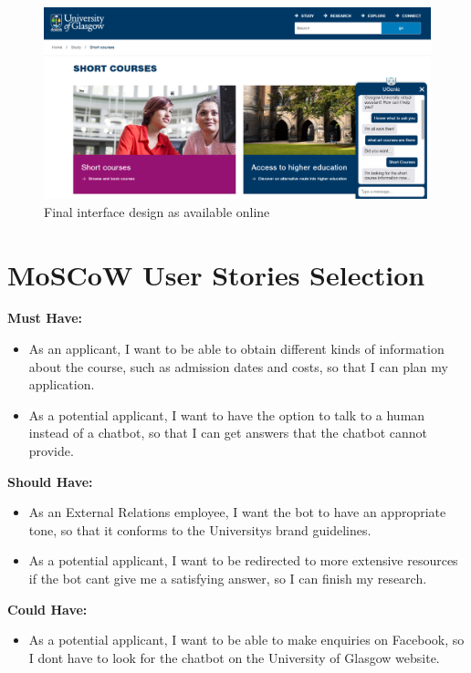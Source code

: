 \documentclass{l3proj}
\begin{document}
\begin{figure}[h!]
    \centering
    \includegraphics[width=0.85\linewidth]{figures/final-image.PNG}
    \caption{Final interface design as available online}
\end{figure}

\section{MoSCoW User Stories Selection}
\label{apdx:moscow}

\textbf{Must Have:}
\begin{itemize}
\item As an applicant, I want to be able to obtain different kinds of information about the course, such as admission dates and costs, so that I can plan my application.
\item As a potential applicant, I want to have the option to talk to a human instead of a chatbot, so that I can get answers that the chatbot cannot provide.
\end{itemize}

\textbf{Should Have:}
\begin{itemize}
\item As an External Relations employee, I want the bot to have an appropriate tone, so that it conforms to the University\textsc{}s brand guidelines.
\item As a potential applicant, I want to be redirected to more extensive resources if the bot can\textsc{}t give me a satisfying answer, so I can finish my research.
\end{itemize}

\textbf{Could Have:}
\begin{itemize}
\item As a potential applicant, I want to be able to make enquiries on Facebook, so I don\textsc{}t have to look for the chatbot on the University of Glasgow website.
\end{itemize}
\end{document}
